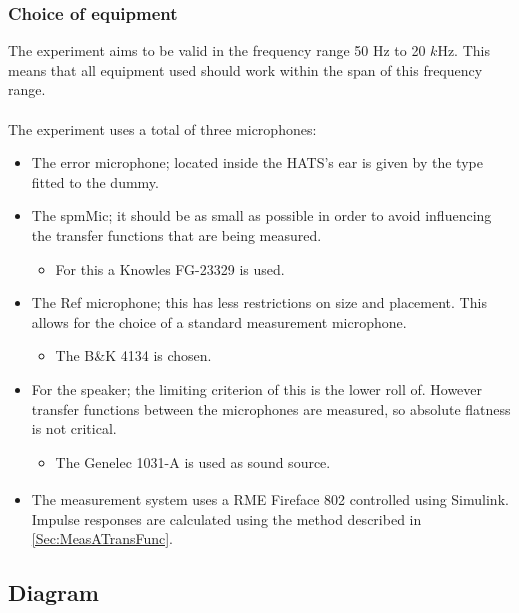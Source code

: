 \subsubsection{Choice of equipment}
The experiment aims to be valid in the frequency range 50 Hz to 20 $k$Hz. This means that all equipment used should work within the span of this frequency range. \\\\
The experiment uses a total of three microphones:
\begin{itemize}
	\item The error microphone; located inside the HATS's ear is given by the type fitted to the dummy.
	\item The spmMic; it should be as small as possible in order to avoid influencing the transfer functions that are being measured.
	\begin{itemize}
		\item For this a Knowles FG-23329 is used.
	\end{itemize}
	\item The Ref microphone; this has less restrictions on size and placement. This allows for the choice of a standard measurement microphone.
	\begin{itemize}
		\item The B\&K 4134 is chosen.
	\end{itemize}
	\item For the speaker; the limiting criterion of this is the lower roll of. However transfer functions between the microphones are measured, so absolute flatness is not critical.
	\begin{itemize}
		\item The Genelec 1031-A is used as sound source.
	\end{itemize}
	\item The measurement system uses a RME Fireface 802 controlled using Simulink\textsuperscript{\textregistered}. Impulse responses are calculated using the method described in \autoref{Sec:MeasATransFunc}. 
\end{itemize}

\subsection{Diagram}


